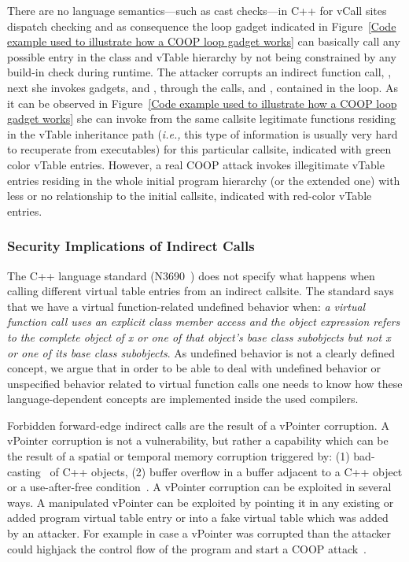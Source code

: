 There are no language semantics---such as cast checks---in C++ for vCall sites dispatch checking and as consequence
the loop gadget indicated in Figure~\ref{Code example used to illustrate how a COOP loop gadget works}
can basically call any possible entry in the class and vTable hierarchy by not being constrained by any build-in check during
runtime. The attacker corrupts an indirect function call, , 
next she invokes gadgets,   and , 
through the calls,  and , contained in the loop. 
As it can be observed in Figure~\ref{Code example used to illustrate how a COOP loop gadget works} she 
can invoke from the same callsite legitimate functions residing in the vTable inheritance path
(\textit{i.e.,} this type of information is usually very hard to recuperate from executables)
for this particular callsite, indicated with green color vTable entries. 
However, a real COOP attack invokes illegitimate
vTable entries residing in the whole initial program hierarchy (or the extended one)
with less or no relationship to the initial callsite,
indicated with red-color vTable entries.

\subsubsection{Security Implications of Indirect Calls}
\label{Security Implications of Forbidden Forward Indirect Calls}
The C++ language standard (N3690~\cite{iso:iecN3690}) does not specify what happens when calling different virtual table entries from an indirect callsite. The standard says that we have a virtual function-related undefined behavior when: \textit{a virtual function call uses an explicit class member access and the object expression refers to the complete object of x or one of that object's base class subobjects but not x or one of its base class subobjects}. As undefined behavior is not a clearly defined concept, we argue that in order to be able to deal with undefined behavior or unspecified behavior related to virtual function calls one needs to know how these language-dependent concepts are implemented inside the used compilers.

Forbidden forward-edge indirect calls are the result of a vPointer corruption. A vPointer corruption is not a vulnerability, but rather a capability which can be the result of a spatial or temporal memory corruption triggered by: 
(1) bad-casting~\cite{byoungyoung:typecasting} of C++ objects, 
(2) buffer overflow in a buffer adjacent to a C++ object or a use-after-free condition~\cite{schuster:coop}.
A vPointer corruption can be exploited in several ways. A manipulated vPointer can be exploited by pointing it in any existing or added program virtual table entry or into a fake virtual table which was added by an attacker. For example in case a vPointer
was corrupted than the attacker could highjack the control flow of the program and start a COOP attack~\cite{schuster:coop}.

